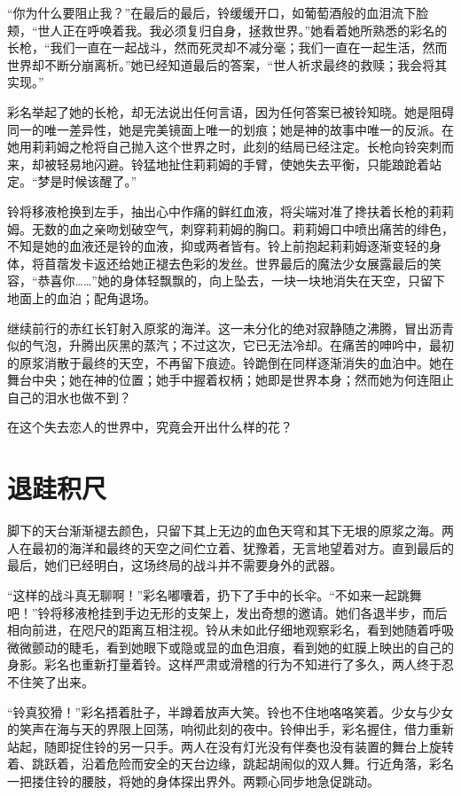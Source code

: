 “你为什么要阻止我？”在最后的最后，铃缓缓开口，如葡萄酒般的血泪流下脸颊，“世人正在呼唤着我。我必须复归自身，拯救世界。”她看着她所熟悉的彩名的长枪，“我们一直在一起战斗，然而死灵却不减分毫；我们一直在一起生活，然而世界却不断分崩离析。”她已经知道最后的答案，“世人祈求最终的救赎；我会将其实现。”

彩名举起了她的长枪，却无法说出任何言语，因为任何答案已被铃知晓。她是阻碍同一的唯一差异性，她是完美镜面上唯一的划痕；她是神的故事中唯一的反派。在她用莉莉姆之枪将自己抛入这个世界之时，此刻的结局已经注定。长枪向铃突刺而来，却被轻易地闪避。铃猛地扯住莉莉姆的手臂，使她失去平衡，只能踉跄着站定。“梦是时候该醒了。”

铃将移液枪换到左手，抽出心中作痛的鲜红血液，将尖端对准了搀扶着长枪的莉莉姆。无数的血之亲吻划破空气，刺穿莉莉姆的胸口。莉莉姆口中喷出痛苦的绯色，不知是她的血液还是铃的血液，抑或两者皆有。铃上前抱起莉莉姆逐渐变轻的身体，将苜蓿发卡返还给她正褪去色彩的发丝。世界最后的魔法少女展露最后的笑容，“恭喜你……”她的身体轻飘飘的，向上坠去，一块一块地消失在天空，只留下地面上的血泊；配角退场。

继续前行的赤红长钉射入原浆的海洋。这一未分化的绝对寂静随之沸腾，冒出沥青似的气泡，升腾出灰黑的蒸汽；不过这次，它已无法冷却。在痛苦的呻吟中，最初的原浆消散于最终的天空，不再留下痕迹。铃跪倒在同样逐渐消失的血泊中。她在舞台中央；她在神的位置；她手中握着权柄；她即是世界本身；然而她为何连阻止自己的泪水也做不到？

在这个失去恋人的世界中，究竟会开出什么样的花？

\section{ 退跬积尺}

脚下的天台渐渐褪去颜色，只留下其上无边的血色天穹和其下无垠的原浆之海。两人在最初的海洋和最终的天空之间伫立着、犹豫着，无言地望着对方。直到最后的最后，她们已经明白，这场终局的战斗并不需要身外的武器。

“这样的战斗真无聊啊！”彩名嘟囔着，扔下了手中的长伞。“不如来一起跳舞吧！”铃将移液枪挂到手边无形的支架上，发出奇想的邀请。她们各退半步，而后相向前进，在咫尺的距离互相注视。铃从未如此仔细地观察彩名，看到她随着呼吸微微颤动的睫毛，看到她眼下或隐或显的血色泪痕，看到她的虹膜上映出的自己的身影。彩名也重新打量着铃。这样严肃或滑稽的行为不知进行了多久，两人终于忍不住笑了出来。

“铃真狡猾！”彩名捂着肚子，半蹲着放声大笑。铃也不住地咯咯笑着。少女与少女的笑声在海与天的界限上回荡，响彻此刻的夜中。铃伸出手，彩名握住，借力重新站起，随即捉住铃的另一只手。两人在没有灯光没有伴奏也没有装置的舞台上旋转着、跳跃着，沿着危险而安全的天台边缘，跳起胡闹似的双人舞。行近角落，彩名一把搂住铃的腰肢，将她的身体探出界外。两颗心同步地急促跳动。

